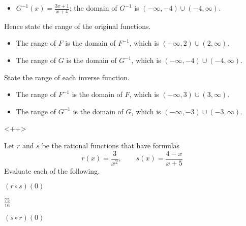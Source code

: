 \begin{exercises}
\begin{problem}
\begin{subproblem}
\begin{shortsolution}
\begin{itemize}
          \item $G^{-1}(x)=\frac{3x+1}{x+4}$; the domain of $G^{-1}$ is $(-\infty,-4)\cup(-4,\infty)$.
         \end{itemize}
        \end{shortsolution}
\end{subproblem}
\begin{subproblem}
Hence state the range of the original functions.
        \begin{shortsolution}
         \begin{itemize}
          \item The range of $F$ is the domain of $F^{-1}$, which is $(-\infty,2)\cup(2,\infty)$.
          \item The range of $G$ is the domain of $G^{-1}$, which is $(-\infty,-4)\cup(-4,\infty)$.
         \end{itemize}
        \end{shortsolution}
\end{subproblem}
\begin{subproblem}
State the range of each inverse function. 
      \begin{shortsolution}
       \begin{itemize}
        \item The range of $F^{-1}$ is the domain of $F$, which is $(-\infty,3)\cup(3,\infty)$.
        \item The range of $G^{-1}$ is the domain of $G$, which is $(-\infty,-3)\cup(-3,\infty)$.
       \end{itemize}<++>
      \end{shortsolution}
\end{subproblem}
\end{problem}
\begin{problem}[Composition]
Let $r$ and $s$ be the rational functions that have formulas
\[
r(x)=\frac{3}{x^2},\qquad s(x)=\frac{4-x}{x+5}
\]
Evaluate each of the following.
\begin{multicols}{3}
    \begin{subproblem}
   $(r\circ s)(0)$
        \begin{shortsolution}
         $\frac{75}{16}$ 
        \end{shortsolution}
    \end{subproblem}
    \begin{subproblem}
   $(s\circ r)(0)$ 
        \begin{shortsolution}

\end{shortsolution}
\end{subproblem}
\end{multicols}
\end{problem}
\end{exercises}
